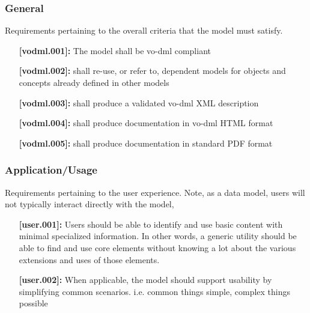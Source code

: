 \documentclass[11pt,a4paper]{ivoa}
\begin{document}
\subsubsection{General}
Requirements pertaining to the overall criteria that the model must satisfy.
  \begin{itemize}
    \item [\textbf{[vodml.001]:}] The model shall be vo-dml compliant
    \item [\textbf{[vodml.002]:}] shall re-use, or refer to, dependent models for objects and concepts already defined in other models
    \item [\textbf{[vodml.003]:}] shall produce a validated vo-dml XML description
    \item [\textbf{[vodml.004]:}] shall produce documentation in vo-dml HTML format
    \item [\textbf{[vodml.005]:}] shall produce documentation in standard PDF format
  \end{itemize}

\subsubsection{Application/Usage}
Requirements pertaining to the user experience.  Note, as a data model, users will not typically interact directly with the model,
  \begin{itemize}
    \item [\textbf{[user.001]:}] Users should be able to identify and use basic content with minimal specialized information. 
      In other words, a generic utility should be able to find and use core elements without knowing a lot about the various extensions and uses of those elements.
    \item [\textbf{[user.002]:}] When applicable, the model should support usability by simplifying common scenarios. i.e. common things simple, complex things possible
  \end{itemize}
\end{document}

